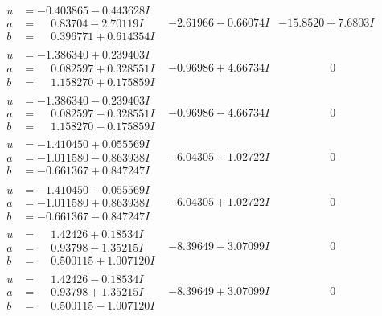 \documentclass[1p]{elsarticle_modified}
\theoremstyle{definition}
\begin{document}
$$\begin{array}{c|c|c}
\begin{aligned}
u &= -0.403865 - 0.443628 I \\
a &= \phantom{-}0.83704 - 2.70119 I \\
b &= \phantom{-}0.396771 + 0.614354 I\end{aligned}
 & -2.61966 - 0.66074 I & -15.8520 + 7.6803 I \\ \hline\begin{aligned}
u &= -1.386340 + 0.239403 I \\
a &= \phantom{-}0.082597 + 0.328551 I \\
b &= \phantom{-}1.158270 + 0.175859 I\end{aligned}
 & -0.96986 + 4.66734 I & \phantom{-0.000000 } 0 \\ \hline\begin{aligned}
u &= -1.386340 - 0.239403 I \\
a &= \phantom{-}0.082597 - 0.328551 I \\
b &= \phantom{-}1.158270 - 0.175859 I\end{aligned}
 & -0.96986 - 4.66734 I & \phantom{-0.000000 } 0 \\ \hline\begin{aligned}
u &= -1.410450 + 0.055569 I \\
a &= -1.011580 - 0.863938 I \\
b &= -0.661367 + 0.847247 I\end{aligned}
 & -6.04305 - 1.02722 I & \phantom{-0.000000 } 0 \\ \hline\begin{aligned}
u &= -1.410450 - 0.055569 I \\
a &= -1.011580 + 0.863938 I \\
b &= -0.661367 - 0.847247 I\end{aligned}
 & -6.04305 + 1.02722 I & \phantom{-0.000000 } 0 \\ \hline\begin{aligned}
u &= \phantom{-}1.42426 + 0.18534 I \\
a &= \phantom{-}0.93798 - 1.35215 I \\
b &= \phantom{-}0.500115 + 1.007120 I\end{aligned}
 & -8.39649 - 3.07099 I & \phantom{-0.000000 } 0 \\ \hline\begin{aligned}
u &= \phantom{-}1.42426 - 0.18534 I \\
a &= \phantom{-}0.93798 + 1.35215 I \\
b &= \phantom{-}0.500115 - 1.007120 I\end{aligned}
 & -8.39649 + 3.07099 I & \phantom{-0.000000 } 0 \\ \hline\begin{aligned}

\end{aligned}
\end{array}$$
\end{document}
